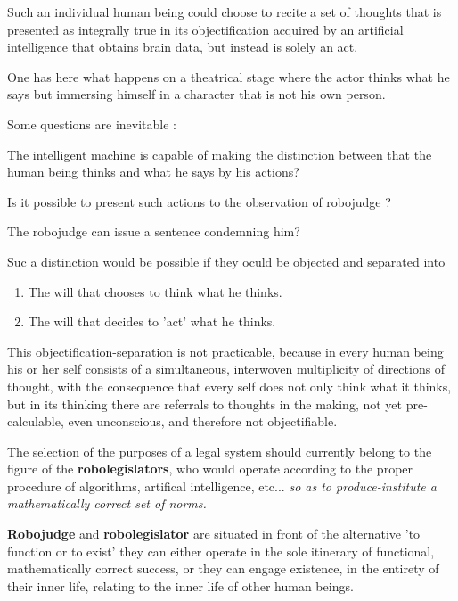 Such an individual human being could choose to recite a set of thoughts that is presented
as integrally true in its objectification acquired by an artificial intelligence that obtains brain data,
but instead is solely an act.

One has here what happens on a theatrical stage where the actor thinks what he says but immersing 
himself in a character that is not his own person.

Some questions are inevitable : 

\begin{question}
The intelligent machine is capable of making the distinction between that the human being thinks and 
what he says by his actions?
\end{question}

\begin{question}
Is it possible to present such actions to the observation of robojudge ?
\end{question}

\begin{question}
The robojudge can issue a sentence condemning him?
\end{question}

Suc a distinction would be possible if they oculd be objected and separated into 
\begin{enumerate}
    \item The will that chooses to think what he thinks.
    \item The will that decides to 'act' what he thinks. 
\end{enumerate}


This objectification-separation is not practicable, because in every human being his or her
self consists of a simultaneous, interwoven  multiplicity of
directions of thought, with the consequence that every self does not only think what it thinks,
but in its thinking there are referrals to thoughts in the making, not yet pre-calculable, even 
unconscious, and therefore not objectifiable.

The selection of the purposes of a legal system should currently belong to the figure of the \textbf{robolegislators}, who would
operate according to the proper procedure of algorithms, artifical intelligence, etc... \textit{so as to produce-institute a 
mathematically correct set of norms.}


\textbf{Robojudge} and \textbf{robolegislator} are situated in front of the alternative 'to function or to exist'
they can either operate in the sole itinerary of functional, mathematically correct success, or they can 
engage existence, in the entirety of their inner life, relating to the inner life of other human beings.

